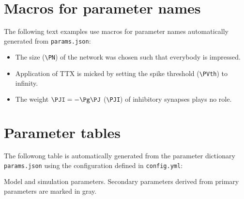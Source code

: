\documentclass[10pt,a4paper,american]{article}
\begin{document}
\section{Macros for parameter names}


The following text examples use macros for parameter names automatically generated from \texttt{params.json}:
\begin{itemize}
\item The size \PN (\verb+\PN+) of the network was chosen such that everybody is impressed.
\item Application of TTX is micked by setting the spike threshold \PVth (\verb+\PVth+) to infinity.
\item The weight $\PJI=-\Pg\PJ$ (\verb+\PJI+) of inhibitory synapses plays no role.
\end{itemize}

\section{Parameter tables}
The followong table is automatically generated from the parameter dictionary \texttt{params.json} using the configuration defined in \texttt{config.yml}: 
\begin{table}[ht!]
\begin{center}
  \parbox{0.8\linewidth}{       %
    \small%
    \centering%
    \renewcommand{\arraystretch}{1.2}%
    \noindent%
    \caption{Model and simulation parameters. Secondary parameters derived from primary parameters are marked in gray.}
    \label{tab:parameter_table}
  }
\end{center}
\end{table}
\end{document}
